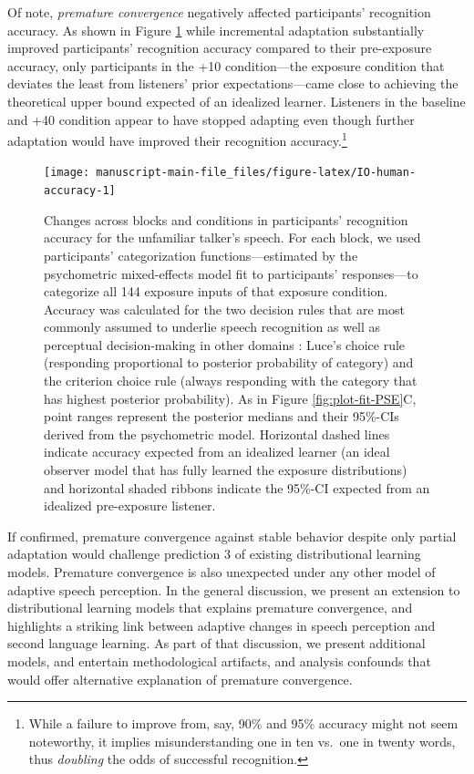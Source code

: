 \documentclass[
  11pt,
  man,mask,floatsintext]{apa6}
\begin{document}
Of note, \emph{premature convergence} negatively affected participants' recognition accuracy. As shown in Figure \ref{fig:IO-human-accuracy} while incremental adaptation substantially improved participants' recognition accuracy compared to their pre-exposure accuracy, only participants in the +10 condition---the exposure condition that deviates the least from listeners' prior expectations---came close to achieving the theoretical upper bound expected of an idealized learner. Listeners in the baseline and +40 condition appear to have stopped adapting even though further adaptation would have improved their recognition accuracy.\footnote{While a failure to improve from, say, 90\% and 95\% accuracy might not seem noteworthy, it implies misunderstanding one in ten vs.~one in twenty words, thus \emph{doubling} the odds of successful recognition.}



\begin{figure}[!ht]

{\centering \texttt{[image: manuscript-main-file\_files/figure-latex/IO-human-accuracy-1]} 

}

\caption{Changes across blocks and conditions in participants' recognition accuracy for the unfamiliar talker's speech. For each block, we used participants' categorization functions---estimated by the psychometric mixed-effects model fit to participants' responses---to categorize all 144 exposure inputs of that exposure condition. Accuracy was calculated for the two decision rules that are most commonly assumed to underlie speech recognition as well as perceptual decision-making in other domains \autocite[for review, see][]{massaro-friedman1990}: Luce's choice rule (responding proportional to posterior probability of category) and the criterion choice rule (always responding with the category that has highest posterior probability). As in Figure \ref{fig:plot-fit-PSE}C, point ranges represent the posterior medians and their 95\%-CIs derived from the psychometric model. Horizontal dashed lines indicate accuracy expected from an idealized learner (an ideal observer model that has fully learned the exposure distributions) and horizontal shaded ribbons indicate the 95\%-CI expected from an idealized pre-exposure listener.}\label{fig:IO-human-accuracy}
\end{figure}

If confirmed, premature convergence against stable behavior despite only partial adaptation would challenge prediction 3 of existing distributional learning models. Premature convergence is also unexpected under any other model of adaptive speech perception. In the general discussion, we present an extension to distributional learning models that explains premature convergence, and highlights a striking link between adaptive changes in speech perception and second language learning. As part of that discussion, we present additional models, and entertain methodological artifacts, and analysis confounds that would offer alternative explanation of premature convergence.
\end{document}

